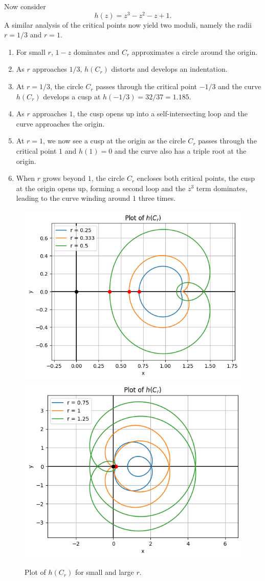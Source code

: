 \documentclass{article}
\begin{document}
Now consider
\[ h(z) = z^3 - z^2 - z + 1. \]
A similar analysis of the critical points now yield two moduli, namely the radii \(r = 1/3\) and \(r = 1\).
\begin{enumerate}
    \item For small \(r\), \(1 - z\) dominates and \(C_r\) approximates a circle around the origin.
    \item As \(r\) approaches \(1/3\), \(h(C_r)\) distorts and develops an indentation.
    \item At \(r = 1/3\), the circle \(C_r\) passes through the critical point \(-1/3\) and the curve \(h(C_r)\) develops a cusp at \(h(-1/3) = 32/37 = 1.185\).
    \item As \(r\) approaches \(1\), the cusp opens up into a self-intersecting loop and the curve approaches the origin.
    \item At \(r = 1\), we now see a cusp at the origin as the circle \(C_r\) passes through the critical point \(1\) and \(h(1) = 0\) and the curve also has a triple root at the origin.
    \item When \(r\) grows beyond \(1\), the circle \(C_r\) encloses both critical points, the cusp at the origin opens up, forming a second loop and the \(z^3\) term dominates, leading to the curve winding around \(1\) three times.
\end{enumerate}

\begin{figure}
    \centering
    \includegraphics[width=0.49\linewidth]{images/hsmallr.png}
    \includegraphics[width=0.49\linewidth]{images/hlarger.png}
    \caption{Plot of \(h(C_r)\) for small and large \(r\).}
\end{figure}
\end{document}
